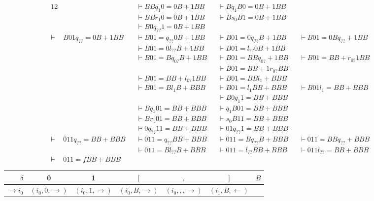 \documentclass[docid=TP11]{tcom_TP}
\begin{document}
{\begin{alignat*}{12}
		   &                    &&\vdash BB q_{1 } 0=0B+1BB &&\vdash B q_{1 } B0=0B+1BB &&\\
		   &                    &&\vdash BB r_{1 } 0=0B+1BB &&\vdash B s_0 B1=0B+1BB    &&\\
		   &                    &&\vdash B0 q_{??} 1=0B+1BB &&\\
	\vdash & B01 q_{??} =0B+1BB &&\vdash B01= q_{??} 0B+1BB &&\vdash B01=0 q_{??} B+1BB &&\vdash B01=0B q_{??} +1BB &&\\
		   &                    &&\vdash B01=0 l_{??} B+1BB &&\vdash B01= l_{??} 0B+1BB &&\\
		   &                    &&\vdash B01=B q_{0?} B+1BB &&\vdash B01=BB q_{0?} +1BB &&\vdash B01=BB+ r_{0?} 1BB &&\\
		   &                    &&                          &&\vdash B01=BB+1 r_{0?} BB &&\\
		   &                    &&\vdash B01=BB+ l_{0?} 1BB &&\vdash B01=BB l_{1 } +BBB &&\\
		   &                    &&\vdash B01=B l_{1 } B+BBB &&\vdash B01= l_{1 } BB+BBB &&\vdash B01 l_{1 } =BB+BBB &&\\
		   &                    &&                          &&\vdash B0 q_{1 } 1=BB+BBB &&\\
		   &                    &&\vdash B q_{1 } 01=BB+BBB &&\vdash q_{1 } B01=BB+BBB  &&\\
		   &                    &&\vdash B r_{1 } 01=BB+BBB &&\vdash s_0 B11=BB+BBB     &&\\
		   &                    &&\vdash 0 q_{??} 11=BB+BBB &&\vdash 01 q_{??} 1=BB+BBB &&\\
	\vdash & 011 q_{??} =BB+BBB &&\vdash 011= q_{??} BB+BBB &&\vdash 011=B q_{??} B+BBB &&\vdash 011=BB q_{??} +BBB &&\\
		   &                    &&\vdash 011=B l_{??} B+BBB &&\vdash 011= l_{??} BB+BBB &&\vdash 011 l_{??} =BB+BBB &&\\
	\vdash & 011= f BB+BBB      && 
\end{alignat*}
\begin{center}
	\begin{tabular}{r | c c c c c c}
		$\delta$          & 0                     & 1                     & $[$                   & $,$                   & $]$                  & $B$ \\ \hline
		$\rightarrow i_0$ & $(i_0,0,\rightarrow)$ & $(i_0,1,\rightarrow)$ & $(i_0,B,\rightarrow)$ & $(i_0,,,\rightarrow)$ & $(i_1,B,\leftarrow)$ &     \\

\end{tabular}
\end{center}}
\end{document}
